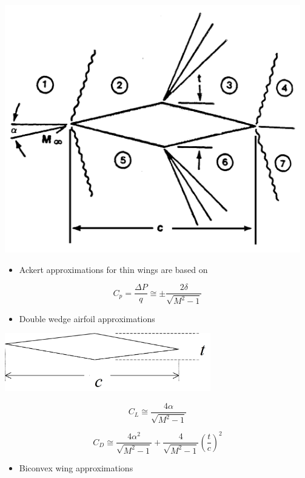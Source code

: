 \documentclass[
]{book}
\providecommand{\tightlist}{%
  \setlength{\itemsep}{0pt}\setlength{\parskip}{0pt}}
\begin{document}
\includegraphics[width=5.075in,height=4.25in]{media/05/image67.svg}

\begin{itemize}
\tightlist
\item
  Ackert approximations for thin wings are based on
\end{itemize}

\[C_p = \frac{\Delta P}{q} \cong \pm\frac{2 \delta}{\sqrt{M^2 - 1}} \]

\begin{itemize}
\tightlist
\item
  Double wedge airfoil approximations
\end{itemize}

\includegraphics[width=3.531in,height=1in]{media/05/image69.svg}

\[C_L \cong \frac{4 \alpha}{\sqrt{M^2 - 1} }\]

\[C_D \cong \frac{4 \alpha^2}{\sqrt{M^2 - 1}} + \frac{4}{\sqrt{M^2 - 1}}\left(\frac{t}{c}\right)^2\]

\begin{itemize}
\tightlist
\item
  Biconvex wing approximations
\end{itemize}
\end{document}
